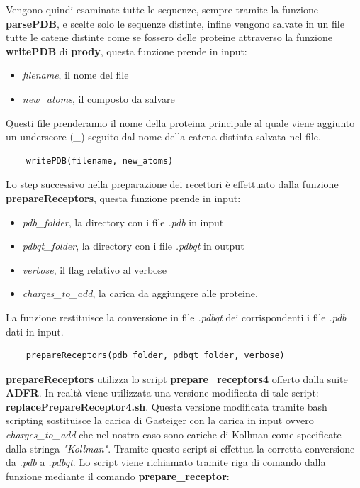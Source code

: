 Vengono quindi esaminate tutte le sequenze, sempre tramite la funzione \textbf{parsePDB}, e scelte solo le sequenze distinte, infine vengono salvate in un file tutte le catene distinte come se fossero delle proteine attraverso la funzione \textbf{writePDB} di \textbf{prody}, questa funzione prende in input:

\begin{itemize}
    \item \textit{filename}, il nome del file
    \item \textit{new\_atoms}, il composto da salvare
\end{itemize}

Questi file prenderanno il nome della proteina principale al quale viene aggiunto un underscore (\textit{\_}) seguito dal nome della catena distinta salvata nel file.

\begin{verbatim}
    writePDB(filename, new_atoms)
\end{verbatim}

Lo step successivo nella preparazione dei recettori è effettuato dalla funzione \textbf{prepareReceptors}, questa funzione prende in input:

\begin{itemize}
    \item \textit{pdb\_folder}, la directory con i file \textit{.pdb} in input
    \item \textit{pdbqt\_folder}, la directory con i file \textit{.pdbqt} in output
    \item \textit{verbose}, il flag relativo al verbose
    \item \textit{charges\_to\_add}, la carica da aggiungere alle proteine.
\end{itemize}

La funzione restituisce la conversione in file \textit{.pdbqt} dei corrispondenti i file \textit{.pdb} dati in input.

\begin{verbatim}
    prepareReceptors(pdb_folder, pdbqt_folder, verbose)
\end{verbatim}

\textbf{prepareReceptors} utilizza lo script \textbf{prepare\_receptors4} offerto dalla suite \textbf{ADFR}. In realtà viene utilizzata una versione modificata di tale script: \textbf{replacePrepareReceptor4.sh}. Questa versione modificata tramite bash scripting sostituisce la carica di Gasteiger con la carica in input ovvero \textit{charges\_to\_add} che nel nostro caso sono cariche di Kollman come specificate dalla stringa \textit{"Kollman"}. Tramite questo script si effettua la corretta conversione da \textit{.pdb} a \textit{.pdbqt}. Lo script viene richiamato tramite riga di comando dalla funzione mediante il comando \textbf{prepare\_receptor}:


